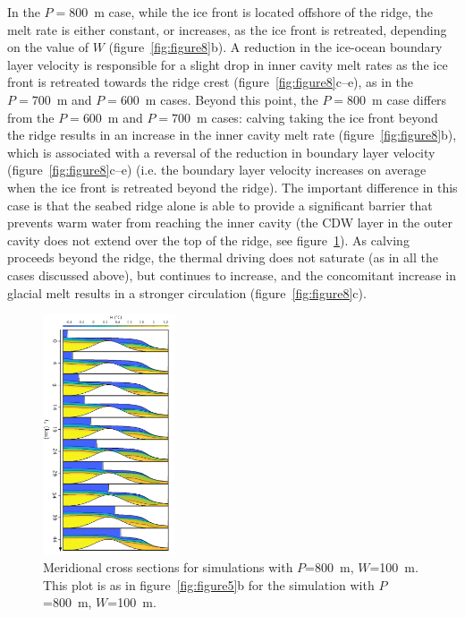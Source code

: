 \documentclass[draft]{agujournal2019}
\begin{document}
In the $P=800$~m case, while the ice front is located offshore of the ridge, the melt rate is either constant, or increases, as the ice front is retreated, depending on the value of $W$ (figure~\ref{fig:figure8}b). A reduction in the ice-ocean boundary layer velocity is responsible for a slight drop in inner cavity melt rates as the ice front is retreated towards the ridge crest (figure~\ref{fig:figure8}c--e), as in the $P=700$~m and $P=600$~m cases. Beyond this point, the $P=800$~m case differs from the $P = 600$~m and $P = 700$~m cases: calving taking the ice front beyond the ridge results in an increase in the inner cavity melt rate (figure~\ref{fig:figure8}b), which is associated with a reversal of the reduction in boundary layer velocity (figure~\ref{fig:figure8}c--e) (i.e. the boundary layer velocity increases on average when the ice front is retreated beyond the ridge). The important difference in this case is that the seabed ridge alone is able to provide a significant barrier that prevents warm water from reaching the inner cavity (the CDW layer in the outer cavity does not extend over the top of the ridge, see figure~\ref{fig:figure9}). As calving proceeds beyond the ridge, the thermal driving does not saturate (as in all the cases discussed above), but continues to increase, and the concomitant increase in glacial melt results in a stronger circulation (figure~\ref{fig:figure8}c).

\begin{figure}
    \centering
    \includegraphics[width = 0.35\textwidth]{../make_figures/plots/figure9.pdf}
    \caption{Meridional cross sections for simulations with $P$=800~m, $W$=100~m. This plot is as in figure~\ref{fig:figure5}b for the simulation with $P$=800~m, $W$=100~m. }
    \label{fig:figure9}
\end{figure}
\end{document}
